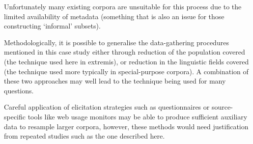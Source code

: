 Unfortunately many existing corpora are unsuitable for this process due to the limited availability of metadata (something that is also an issue for those constructing `informal' subsets).

Methodologically, it is possible to generalise the data-gathering procedures mentioned in this case study either through reduction of the population covered (the technique used here in extremis), or reduction in the linguistic fields covered (the technique used more typically in special-purpose corpora).  A combination of these two approaches may well lead to the technique being used for many questions.

Careful application of elicitation strategies such as questionnaires or source-specific tools like web usage monitors may be able to produce sufficient auxiliary data to resample larger corpora, however, these methods would need justification from repeated studies such as the one described here.
